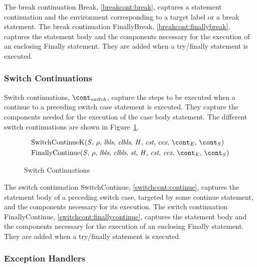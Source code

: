 \documentclass[a4paper,oneside,fleqn]{article}
\begin{document}
The break continuation Break, \ref{breakcont:break}, captures a statement continuation and the environment corresponding to a target label or a break statement.
The break continuation FinallyBreak, \ref{breakcont:finallybreak}, captures the statement body and the components necessary for the execution of an enclosing Finally statement.
They are added when a try/finally statement is executed.


\subsubsection{Switch Continuations}
\label{subsubsec:switch-continuations}

Switch continuations, $\switchcont$, capture the steps to be executed when a continue to a preceding switch case statement is executed.
They capture the components needed for the execution of the case body statement.
The different switch continuations are shown in Figure~\ref{figure:switchconts}.

\newcommand{\ContinueK}{\mathrm{SwitchContinueK}(\stmt,\,\env,\,\lbls,\,\clbls,\,\handler,\,\cstrace,\,\cex,\,\econt,\,\scont)}
\newcommand{\FinallyContinue}[2]{\mathrm{FinallyContinue}({#1},\,\env,\,\lbls,\,\clbls,\,\strace,\,\handler,\,\cstrace,\,\cex,\,\econt,\,{#2})}

\begin{figure}[Htp]
  \begin{eqfigure}
  \begin{align}
    &\ContinueK \label{switchcont:continue} \\
    &\FinallyContinue{\stmt}{\scont} \label{switchcont:finallycontinue}
  \end{align}
  \caption{Switch Continuations}
  \label{figure:switchconts}
  \end{eqfigure}
\end{figure}

The switch continuation SwitchContinue, \ref{switchcont:continue}, captures the statement body of a preceding switch case, targeted by some continue statement, and the components necessary for its execution.
The switch continuation FinallyContinue, \ref{switchcont:finallycontinue}, captures the statement body and the components necessary for the execution of an enclosing Finally statement.
They are added when a try/finally statement is executed.


\subsubsection{Exception Handlers}
\label{subsubsec:exception-handlers}
\end{document}
